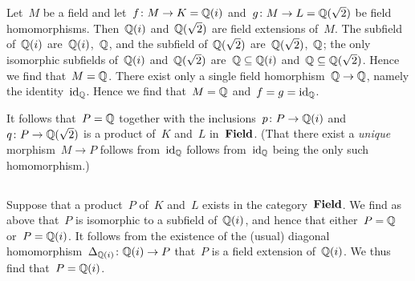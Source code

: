\section{}





\subsection{}

Let~$M$ be a field and let~$f \colon M \to K = \mathbb{Q}(i)$ and~$g \colon M \to L = \mathbb{Q}(\sqrt{2})$ be field homomorphisms.
Then~$\mathbb{Q}(i)$ and~$\mathbb{Q}(\sqrt{2})$ are field extensions of~$M$.
The subfield of~$\mathbb{Q}(i)$ are~$\mathbb{Q}(i)$,~$\mathbb{Q}$, and the subfield of~$\mathbb{Q}(\sqrt{2})$ are~$\mathbb{Q}(\sqrt{2})$,~$\mathbb{Q}$;
the only isomorphic subfields of~$\mathbb{Q}(i)$ and~$\mathbb{Q}(\sqrt{2})$ are~$\mathbb{Q} \subseteq \mathbb{Q}(i)$ and~$\mathbb{Q} \subseteq \mathbb{Q}(\sqrt{2})$.
Hence we find that~$M = \mathbb{Q}$.
There exist only a single field homorphism~$\mathbb{Q} \to \mathbb{Q}$, namely the identity~$\operatorname{id}_{\mathbb{Q}}$.
Hence we find that~$M = \mathbb{Q}$ and~$f = g = \operatorname{id}_{\mathbb{Q}}$.

It follows that~$P = \mathbb{Q}$ together with the inclusions~$p \colon P \to \mathbb{Q}(i)$ and~$q \colon P \to \mathbb{Q}(\sqrt{2})$ is a product of~$K$ and~$L$ in~$\mathbf{Field}$.
(That there exist a \emph{unique} morphism~$M \to P$ follows from~$\operatorname{id}_{\mathbb{Q}}$ follows from~$\operatorname{id}_{\mathbb{Q}}$ being the only such homomorphism.)





\subsection{}

Suppose that a product~$P$ of~$K$ and~$L$ exists in the category~$\mathbf{Field}$.
We find as above that~$P$ is isomorphic to a subfield of~$\mathbb{Q}(i)$, and hence that either~$P = \mathbb{Q}$ or~$P = \mathbb{Q}(i)$.
It follows from the existence of the (usual) diagonal homomorphism~$\Delta_{\mathbb{Q}(i)} \colon \mathbb{Q}(i) \to P$ that~$P$ is a field extension of~$\mathbb{Q}(i)$.
We thus find that~$P = \mathbb{Q}(i)$.

